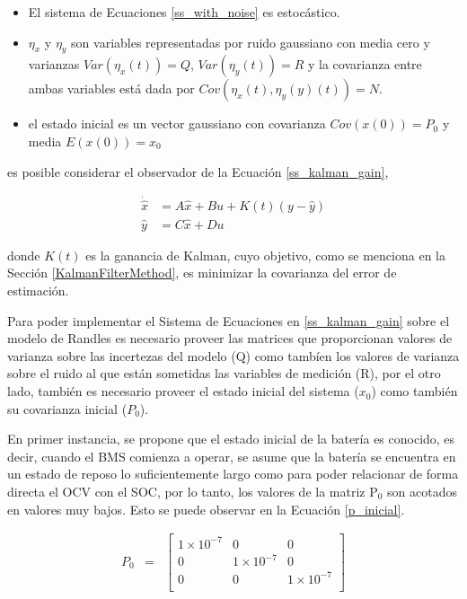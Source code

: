 \documentclass[10pt, a4paper]{report}
\begin{document}
\begin{itemize}
    \item El sistema de Ecuaciones \ref{ss_with_noise} es estoc\'astico.
    \item $\eta_x$ y $\eta_y$ son variables representadas por ruido gaussiano
        con media cero y varianzas $Var\left(\eta_x(t)\right) = Q$,
        $Var\left(\eta_y(t)\right) = R$ y la covarianza entre ambas variables
        est\'a dada por $Cov\left(\eta_x(t), \eta_y(y)(t)\right) = N$.
    \item el estado inicial es un vector gaussiano con covarianza
        $Cov\left(x(0)\right) = P_0$ y media $E\left(x(0)\right) = x_0$
\end{itemize}

es posible considerar el observador de la Ecuaci\'on \ref{ss_kalman_gain},

\begin{align}
    \dot{\hat{x}} &= A\hat{x} + Bu + K(t)(y - \hat{y})\nonumber\\
    \hat{y} &= C\hat{x} + Du \label{ss_kalman_gain}
\end{align}

donde $K(t)$ es la ganancia de Kalman, cuyo objetivo, como se menciona en la
Secci\'on \ref{KalmanFilterMethod}, es minimizar la covarianza del error de
estimaci\'on. 

Para poder implementar el Sistema de Ecuaciones en \ref{ss_kalman_gain} sobre
el modelo de Randles es necesario proveer las matrices que proporcionan valores 
de varianza sobre las incertezas del modelo (Q) como tamb\'ien los valores de
varianza sobre el ruido al que est\'an sometidas las variables de medici\'on
(R), por el otro lado, tambi\'en es necesario proveer el estado inicial del
sistema ($x_0$) como tambi\'en su covarianza inicial ($P_0$).

En primer instancia, se propone que el estado inicial de la bater\'ia es
conocido, es decir, cuando el \acrshort{BMS} comienza a operar, se asume que la
bater\'ia se encuentra en un estado de reposo lo suficientemente largo como para
poder relacionar de forma directa el \acrshort{OCV} con el \acrshort{SOC}, por
lo tanto, los valores de la matriz $\mathrm{P_0}$ son acotados en valores muy
bajos. Esto se puede observar en la Ecuaci\'on \ref{p_inicial}.


\begin{equation}
    \begin{array}{llll}
	P_0 & = & \begin{bmatrix}
        1\times10^{-7}  & 0              & 0 \\
        0               & 1\times10^{-7} & 0 \\
        0               & 0              & 1\times10^{-7} \\
	\end{bmatrix} 
    \end{array}
    \label{p_inicial}
\end{equation}
\end{document}
